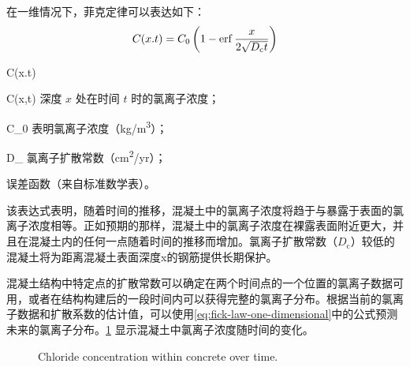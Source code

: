 在一维情况下，菲克定律可以表达如下：
\begin{equation}
  \label{eq:fick-law-one-dimensional}
  C(x.t) = C_0 \left( 1-\operatorname{erf} \frac{x}{2\sqrt{D_\text{c}t}}\right)
\end{equation}
\begin{EqDesc}{C(x.t)}
  \item[C(x,t)] 深度 $x$ 处在时间 $t$ 时的氯离子浓度；
  \item[C_0] 表明氯离子浓度（\unit{kg/m^3}）；
  \item[D_\text{c}] 氯离子扩散常数（\unit{cm^2/yr}）；
  \item[\erf] 误差函数（来自标准数学表）。
\end{EqDesc}

该表达式表明，随着时间的推移，混凝土中的氯离子浓度将趋于与暴露于表面的氯离子浓度相等。正如预期的那样，混凝土中的氯离子浓度在裸露表面附近更大，并且在混凝土内的任何一点随着时间的推移而增加。氯离子扩散常数（$D_\text{c}$）较低的混凝土将为距离混凝土表面深度x的钢筋提供长期保护。

混凝土结构中特定点的扩散常数可以确定在两个时间点的一个位置的氯离子数据可用，或者在结构构建后的一段时间内可以获得完整的氯离子分布。根据当前的氯离子数据和扩散系数的估计值，可以使用\cref{eq:fick-law-one-dimensional}中的公式预测未来的氯离子分布。\cref{fig:choloride-concentration-time} 显示混凝土中氯离子浓度随时间的变化。

\begin{figure}
  \caption{Chloride concentration within concrete over time.}
  \label{fig:choloride-concentration-time}
\end{figure}

